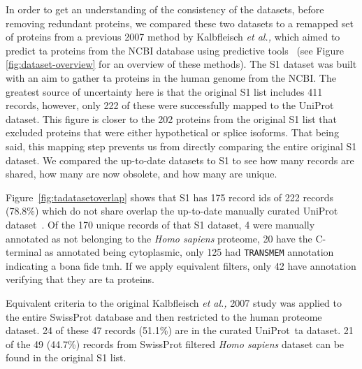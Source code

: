 In order to get an understanding of the consistency of the datasets, before removing redundant proteins, we compared these two datasets to a remapped set of proteins from a previous 2007 method by Kalbfleisch \textit{et al.,} which aimed to predict \gls{ta} proteins from the NCBI database using predictive tools~\cite{Kalbfleisch2007} (see Figure \ref{fig:dataset-overview} for an overview of these methods).
The S1 dataset was built with an aim to gather \gls{ta} proteins in the human genome from the NCBI.
The greatest source of uncertainty here is that the original S1 list includes 411 records, however, only 222 of these were successfully mapped to the UniProt dataset.
This figure is closer to the 202 proteins from the original S1 list that excluded proteins that were either hypothetical or splice isoforms.
That being said, this mapping step prevents us from directly comparing the entire original S1 dataset.
We compared the up-to-date datasets to S1 to see how many records are shared, how many are now obsolete, and how many are unique.

Figure~\ref{fig:tadatasetoverlap} shows that S1 has 175 record ids of 222 records (78.8\%) which do not share overlap the up-to-date manually curated UniProt dataset~\cite{TheUniProtConsortium2014}.
Of the 170 unique records of that S1 dataset, 4 were manually annotated as not belonging to the \textit{Homo sapiens} proteome, 20 have the C\--terminal as annotated being cytoplasmic, only 125 had \texttt{TRANSMEM} annotation indicating a bona fide \gls{tmh}.
If we apply equivalent filters, only 42 have annotation verifying that they are \gls{ta} proteins.

Equivalent criteria to the original Kalbfleisch \textit{et al.,} 2007 \cite{Kalbfleisch2007} study was applied to the entire SwissProt database and then restricted to the human proteome dataset.
24 of these 47 records (51.1\%) are in the curated UniProt~\gls{ta}  dataset.
21 of the 49 (44.7\%) records from SwissProt filtered \textit{Homo sapiens} dataset can be found in the original S1 list.

